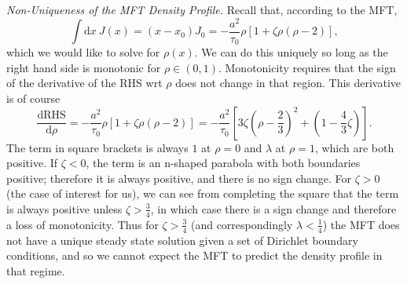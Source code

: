 \documentclass[
reprint,
 amsmath,amssymb,
 aps,
 prl,
]{revtex4-1}
\begin{document}
\textit{Non-Uniqueness of the MFT Density Profile.}
Recall that, according to the MFT,
\begin{equation}
 \int \! \!  \mathrm{d}x \ J(x) = (x-x_0)J_0 = -\frac{a^2}{\tau_0} \rho \left[1+\zeta \rho\left(\rho-2\right)\right], \label{cubic}
\end{equation}
which we would like to solve for $\rho(x)$. We can do this uniquely so long as the right hand side is monotonic for $\rho \in (0, 1)$. Monotonicity requires that the sign of the derivative of the RHS wrt $\rho$ does not change in that region.
This derivative is of course
\begin{equation}
 \frac{\mathrm{d} \mathrm{RHS}}{\mathrm{d} \rho} = -\frac{a^2}{\tau_0} \rho \left[1+\zeta \rho\left(\rho-2\right)\right] = -\frac{a^2}{\tau_0} \left[ 3 \zeta (\rho-\frac{2}{3})^2 + (1-\frac{4}{3} \zeta) \right].
\end{equation}
The term in square brackets is always $1$ at $\rho=0$ and $\lambda$ at $\rho=1$, which are both positive.
If $\zeta<0$, the term is an n-shaped parabola with both boundaries positive; therefore it is always positive, and there is no sign change.
For $\zeta>0$ (the case of interest for us), we can see from completing the square that the term is always positive unless $\zeta > \frac{3}{4}$, in which case there is a sign change and therefore a loss of monotonicity.
Thus for $\zeta > \frac{3}{4}$ (and correspondingly $\lambda<\frac{1}{4}$) the MFT does not have a unique steady state solution given a set of Dirichlet boundary conditions, and so we cannot expect the MFT to predict the density profile
in that regime.
\end{document}
